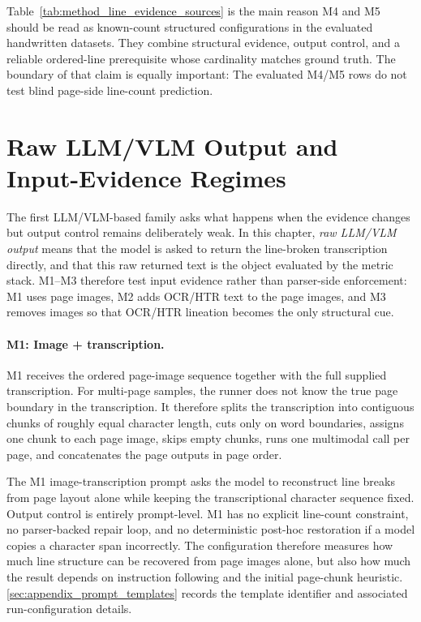 Table~\ref{tab:method_line_evidence_sources} is the main reason M4 and M5 should be read as known-count structured configurations in the evaluated handwritten datasets. They combine structural evidence, output control, and a reliable ordered-line prerequisite whose cardinality matches ground truth. The boundary of that claim is equally important: The evaluated M4/M5 rows do not test blind page-side line-count prediction.

\clearpage

\section{Raw LLM/VLM Output and Input-Evidence Regimes}
\label{sec:method_raw_prompt_output}

The first LLM/VLM-based family asks what happens when the evidence changes but output control remains deliberately weak. In this chapter, \emph{raw LLM/VLM output} means that the model is asked to return the line-broken transcription directly, and that this raw returned text is the object evaluated by the metric stack. M1--M3 therefore test input evidence rather than parser-side enforcement: M1 uses page images, M2 adds OCR/HTR text to the page images, and M3 removes images so that OCR/HTR lineation becomes the only structural cue.

\paragraph{M1: Image + transcription.}
\label{sec:method_m1}
M1 receives the ordered page-image sequence together with the full supplied transcription. For multi-page samples, the runner does not know the true page boundary in the transcription. It therefore splits the transcription into contiguous chunks of roughly equal character length, cuts only on word boundaries, assigns one chunk to each page image, skips empty chunks, runs one multimodal call per page, and concatenates the page outputs in page order.

The M1 image-transcription prompt asks the model to reconstruct line breaks from page layout alone while keeping the transcriptional character sequence fixed. Output control is entirely prompt-level. M1 has no explicit line-count constraint, no parser-backed repair loop, and no deterministic post-hoc restoration if a model copies a character span incorrectly. The configuration therefore measures how much line structure can be recovered from page images alone, but also how much the result depends on instruction following and the initial page-chunk heuristic. \autoref{sec:appendix_prompt_templates} records the template identifier and associated run-configuration details.

